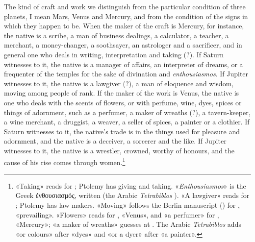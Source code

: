 \documentclass[11pt]{article}
\newcommand{\Fol}[1]{\marginpar{\footnotesize\color{gray}f.\,#1}}
\begin{document}
\par \Fol{65v}The kind of craft and work we distinguish from the particular condition of three planets, I mean Mars, Venus and Mercury, and from the condition of the signs in which they happen to be. When the maker of the craft is Mercury, for instance, the native is a scribe, a man of business dealings, a calculator, a teacher, a merchant, a money-changer, a soothsayer, an astrologer and a sacrificer, and in general one who deals in writing, interpretation and taking (?). If Saturn witnesses to it, the native is a manager of affairs, an interpreter of dreams, or a frequenter of the temples for the sake of divination and \emph{enthousiasmos}. If Jupiter witnesses to it, the native is a lawgiver (?), a man of eloquence and wisdom, moving among people of rank. If the maker of the work is Venus, the native is one who deals with the scents of flowers, or with perfume, wine, dyes, spices or things of adornment, such as a perfumer, a maker of wreaths (?), a tavern-keeper, a wine merchant, a druggist, a weaver, a seller of spices, a painter or a clothier. If Saturn witnesses to it, the native's trade is in the things used for pleasure and adornment, and the native is a deceiver, a sorcerer and the like. If Jupiter witnesses to it, the native is a wrestler, crowned, worthy of honours, and the cause of his rise comes through women.\footnote{«Taking» reads  for ; Ptolemy has giving and taking. «\emph{Enthousiasmos}» is the Greek ἐνθουσιασμός, written  (the Arabic \emph{Tetrabiblos} ). «A lawgiver» reads  for ; Ptolemy has law-makers. «Moving» follows the Berlin manuscript () for , «prevailing». «Flowers» reads  for , «Venus», and «a perfumer»  for , «Mercury»; «a maker of wreaths» guesses at . The Arabic \emph{Tetrabiblos} adds «or colours» after «dyes» and «or a dyer» after «a painter».}\par
\end{document}
